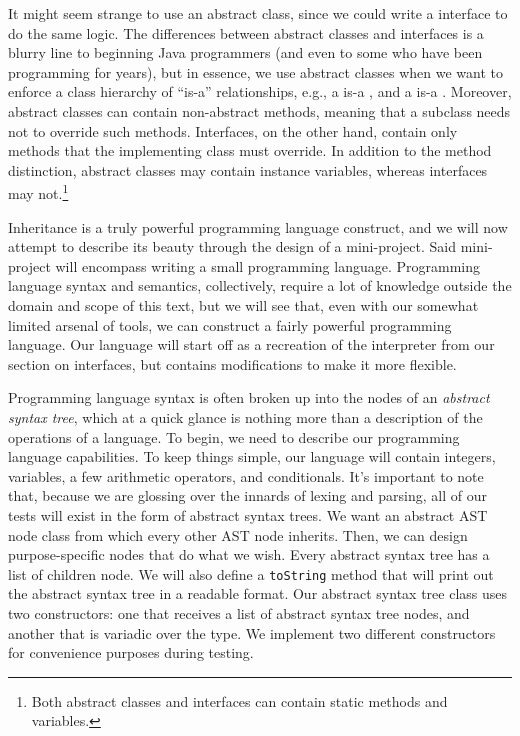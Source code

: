 It might seem strange to use an abstract class, since we could write a  interface to do the same logic. The differences between abstract classes and interfaces is a blurry line to beginning Java programmers (and even to some who have been programming for years), but in essence, we use abstract classes when we want to enforce a class hierarchy of ``is-a'' relationships, e.g., a  is-a , and a  is-a . Moreover, abstract classes can contain non-abstract methods, meaning that a subclass needs not to override such methods. Interfaces, on the other hand, contain only methods that the implementing class must override. In addition to the method distinction, abstract classes may contain instance variables, whereas interfaces may not.\footnote{Both abstract classes and interfaces can contain static methods and variables.}

\example Inheritance is a truly powerful programming language construct, and we will now attempt to describe its beauty through the design of a mini-project. Said mini-project will encompass writing a small programming language. Programming language syntax and semantics, collectively, require a lot of knowledge outside the domain and scope of this text, but we will see that, even with our somewhat limited arsenal of tools, we can construct a fairly powerful programming language. Our language will start off as a recreation of the interpreter from our section on interfaces, but contains modifications to make it more flexible.

Programming language syntax is often broken up into the nodes of an \textit{abstract syntax tree}, which at a quick glance is nothing more than a description of the operations of a language. To begin, we need to describe our programming language capabilities. To keep things simple, our language will contain integers, variables, a few arithmetic operators, and conditionals. It's important to note that, because we are glossing over the innards of lexing and  parsing, all of our tests will exist in the form of abstract syntax trees. We want an abstract AST node class from which every other AST node inherits. Then, we can design purpose-specific nodes that do what we wish. Every abstract syntax tree has a list of children node. We will also define a \texttt{toString} method that will print out the abstract syntax tree in a readable format. Our abstract syntax tree class uses two constructors: one that receives a list of abstract syntax tree nodes, and another that is variadic over the  type. We implement two different constructors for convenience purposes during testing.


